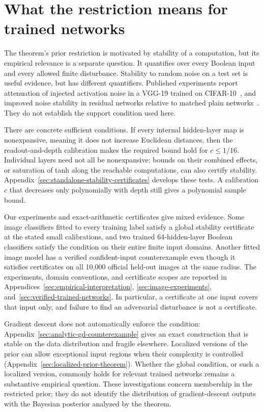 \documentclass[11pt]{article}
\begin{document}


\section{What the restriction means for trained networks}
\label{sec:restriction-in-practice}

The theorem's prior restriction is motivated by stability of a computation,
but its empirical relevance is a separate question. It quantifies over
every Boolean input and every allowed finite disturbance. Stability to
random noise on a test set is useful evidence, but has different
quantifiers. Published experiments report attenuation of injected
activation noise in a VGG-19 trained on CIFAR-10~\cite{arora}, and improved
noise stability in residual networks relative to matched plain
networks~\cite{yutomasi}. They do not establish the support condition
used here.

There are concrete sufficient conditions. If every internal hidden-layer
map is nonexpansive, meaning it does not increase Euclidean distances,
then the readout-and-depth calibration makes the required bound hold
for $c\le1/16$. Individual layers need not all be nonexpansive: bounds
on their combined effects, or saturation of tanh along the reachable
computations, can also certify stability.
Appendix~\ref{sec:standalone-stability-certificates} develops these tests.
A calibration $c$ that decreases only polynomially with depth still gives
a polynomial sample bound.

Our experiments and exact-arithmetic certificates give mixed evidence.
Some image classifiers fitted to every training label satisfy a global
stability certificate at the stated small calibrations, and two trained
64-hidden-layer Boolean classifiers satisfy the condition on their entire
finite input domains. Another fitted image model has a verified
confident-input counterexample even though it satisfies certificates
on all 10,000 official held-out images at the same radius.
The experiments, domain conventions, and certificate scopes are reported
in Appendices~\ref{sec:empirical-interpretation},
\ref{sec:image-experiments}, and~\ref{sec:verified-trained-networks}.
In particular, a certificate at one input covers that input only, and
failure to find an adversarial disturbance is not a certificate.

Gradient descent does not automatically enforce the condition:
Appendix~\ref{sec:analytic-gd-counterexample} gives an exact construction
that is stable on the data distribution and fragile elsewhere.
Localized versions of the prior can allow exceptional input regions when
their complexity is controlled (Appendix~\ref{sec:localized-prior-theorem}).
Whether the global condition, or such a localized version, commonly holds
for relevant trained networks remains a substantive empirical question.
These investigations concern membership in the restricted prior;
they do not identify the distribution of gradient-descent outputs with
the Bayesian posterior analyzed by the theorem.
\end{document}
